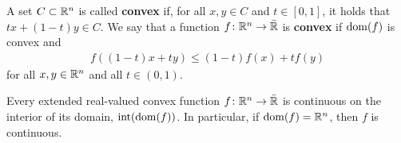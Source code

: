 \begin{definition}
    A set $C\subset\mathbb{R}^n$ is called \textbf{convex} if, for all 
    $x,y\in C$ and $t\in [0, 1]$, it holds that $tx + (1-t)y \in C$.
    We say that a function $f\colon \mathbb{R}^n\to\bar{\mathbb{R}}$ is \textbf{convex} if
    $\operatorname{dom}(f)$ is convex and
    \begin{align*}
        f((1-t) x + t y) \leq (1-t) f(x) + t f(y)
    \end{align*}
    for all $x, y\in\mathbb{R}^n$ and all $t\in (0, 1)$.
\end{definition}

\begin{proposition}
    \label{prop:convex-implies-continuous}
    Every extended real-valued convex function $f\colon\mathbb{R}^n\to\bar{\mathbb{R}}$
    is continuous on the interior of its domain, $\text{int}(\operatorname{dom}(f))$.
    In particular, if $\operatorname{dom}(f) = \mathbb{R}^n$, then $f$ is continuous.
\end{proposition}


